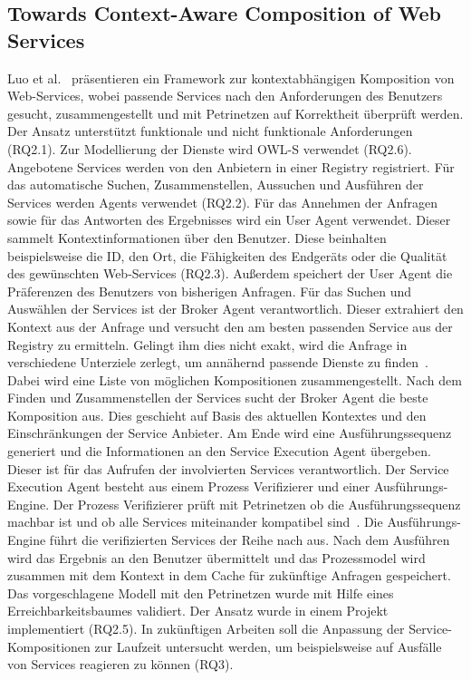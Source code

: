 \documentclass[conference,compsoc,ngerman]{IEEEtran}
\begin{document}
\subsection{Towards Context-Aware Composition of Web Services}
Luo et al.~\cite{luo2006towards} präsentieren ein Framework zur kontextabhängigen Komposition von Web-Services, wobei passende Services nach den Anforderungen des Benutzers gesucht, zusammengestellt und mit Petrinetzen auf Korrektheit überprüft werden. Der Ansatz unterstützt funktionale und nicht funktionale Anforderungen (RQ2.1). Zur Modellierung der Dienste wird OWL-S verwendet (RQ2.6). Angebotene Services werden von den Anbietern in einer Registry registriert. Für das automatische Suchen, Zusammenstellen, Aussuchen und Ausführen der Services werden Agents verwendet (RQ2.2).
Für das Annehmen der Anfragen sowie für das Antworten des Ergebnisses wird ein User Agent verwendet. Dieser sammelt Kontextinformationen über den Benutzer. Diese beinhalten beispielsweise die ID, den Ort, die Fähigkeiten des Endgeräts oder die Qualität des gewünschten Web-Services (RQ2.3). Außerdem speichert der User Agent die Präferenzen des Benutzers von bisherigen Anfragen.
Für das Suchen und Auswählen der Services ist der Broker Agent verantwortlich. Dieser extrahiert den Kontext aus der Anfrage und versucht den am besten passenden Service aus der Registry zu ermitteln. Gelingt ihm dies nicht exakt, wird die Anfrage in verschiedene Unterziele zerlegt, um annähernd passende Dienste zu finden~\cite{luo2006towards}. Dabei wird eine Liste von möglichen Kompositionen zusammengestellt. Nach dem Finden und Zusammenstellen der Services sucht der Broker Agent die beste Komposition aus. Dies geschieht auf Basis des aktuellen Kontextes und den Einschränkungen der Service Anbieter. Am Ende wird eine Ausführungssequenz generiert und die Informationen an den Service Execution Agent übergeben. Dieser ist für das Aufrufen der involvierten Services verantwortlich. Der Service Execution Agent besteht aus einem Prozess Verifizierer und einer Ausführungs-Engine. Der Prozess Verifizierer prüft mit Petrinetzen ob die Ausführungssequenz machbar ist und ob alle Services miteinander kompatibel sind~\cite{luo2006towards}. Die Ausführungs-Engine führt die verifizierten Services der Reihe nach aus. Nach dem Ausführen wird das Ergebnis an den Benutzer übermittelt und das Prozessmodel wird zusammen mit dem Kontext in dem Cache für zukünftige Anfragen gespeichert.
Das vorgeschlagene Modell mit den Petrinetzen wurde mit Hilfe eines Erreichbarkeitsbaumes validiert. Der Ansatz wurde in einem Projekt implementiert (RQ2.5). In zukünftigen Arbeiten soll die Anpassung der Service-Kompositionen zur Laufzeit untersucht werden, um beispielsweise auf Ausfälle von Services reagieren zu können (RQ3).
\end{document}
